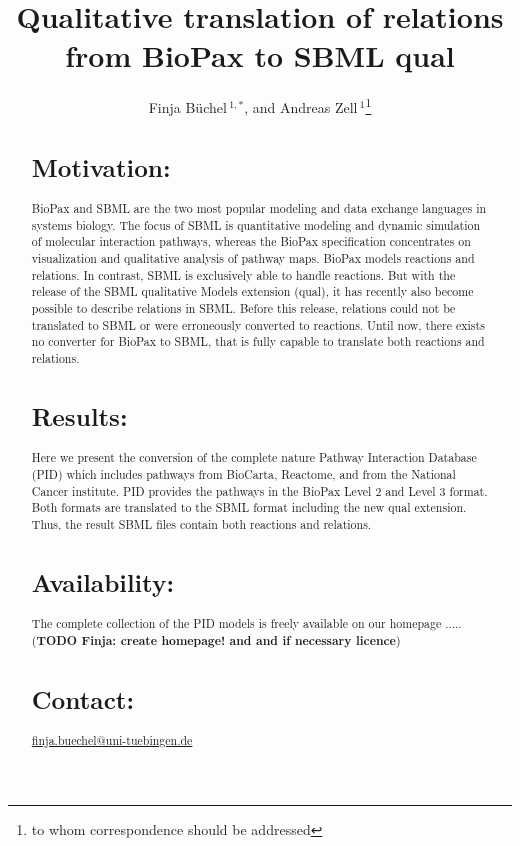 \documentclass{bioinfo}
\begin{document}

\title[BioPax to SBML qual]{Qualitative translation of relations from BioPax to SBML qual}
\author[B\"uchel \textit{et~al}]{Finja B\"uchel\,$^{1,*}$,
and Andreas Zell\,$^1$\footnote{to whom correspondence should be addressed}}
\address{$^{1}$Department of Cognitive Systems, University of Tuebingen, Sand 1, 72076 T\"ubingen, Germany\\}




\maketitle

\begin{abstract}

\section{Motivation:}
BioPax and SBML are the two most popular modeling and data exchange languages in systems biology. The focus of SBML is quantitative modeling and dynamic simulation of molecular interaction pathways, whereas the BioPax specification concentrates on visualization and qualitative analysis of pathway maps. BioPax models reactions and relations. In contrast, SBML is exclusively able to handle reactions. But with the release of the SBML qualitative Models extension (qual), it has recently also become possible to describe relations in SBML. Before this release, relations could not be translated to SBML or were erroneously converted to reactions. Until now, there exists no converter for BioPax to SBML, that is fully capable to translate both reactions and relations.
\section{Results:}
Here we present the conversion of the complete nature Pathway Interaction Database (PID) which includes pathways from BioCarta, Reactome, and from the National Cancer institute. PID provides the pathways in the BioPax Level 2 and Level 3 format. Both formats are translated to the SBML format including the new qual extension. Thus, the result SBML files contain both reactions and relations.
\section{Availability:}
The complete collection of the PID models is freely available on our homepage ..... (\textbf{TODO Finja: create homepage! and and if necessary licence})
\section{Contact:} \href{finja.buechel@uni-tuebingen.de}{finja.buechel@uni-tuebingen.de}
\end{abstract}
\end{document}
